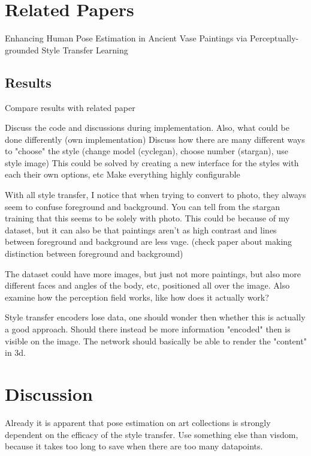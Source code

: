 \section{Related Papers}
Enhancing Human Pose Estimation in Ancient Vase Paintings via Perceptually-grounded Style Transfer Learning \cite{Madhu2020}\\
\subsection{Results}
\label{sec:baseline_related_papers_results}
Compare results with related paper

Discuss the code and discussions during implementation.
Also, what could be done differently (own implementation)
Discuss how there are many different ways to "choose" the style (change model (cyclegan), choose number (stargan), use style image)
This could be solved by creating a new interface for the styles with each their own options, etc 
Make everything highly configurable

With all style transfer, I notice that when trying to convert to photo, they always seem to confuse foreground and background.
You can tell from the stargan training that this seems to be solely with photo.
This could be because of my dataset, but it can also be that paintings aren't as high contrast and lines between foreground and background are less vage.
(check paper about making distinction between foreground and background)

The dataset could have more images, but just not more paintings, but also more different faces and angles of the body, etc, positioned all over the image.
Also examine how the perception field works, like how does it actually work?

Style transfer encoders lose data, one should wonder then whether this is actually a good approach.
Should there instead be more information "encoded" then is visible on the image.
The network should basically be able to render the "content" in 3d.

\section{Discussion}
\label{sec:baseline_discussion}
Already it is apparent that pose estimation on art collections is strongly dependent on the efficacy of the style transfer.
Use something else than visdom, because it takes too long to save when there are too many datapoints.
